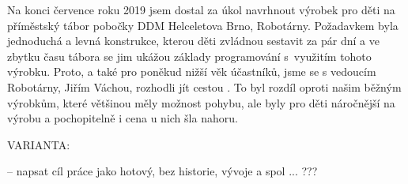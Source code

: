 



Na konci července roku 2019 jsem dostal za úkol navrhnout výrobek pro děti na příměstský tábor
pobočky DDM Helceletova Brno, Robotárny. 
Poža\-dav\-kem byla jednoduchá a levná konstrukce,
kterou děti zvládnou sestavit za pár dní a ve zbytku času tábora se jim ukážou základy programování
s~využitím tohoto výrobku. Proto, a také pro poněkud nižší věk účastníků, jsme se s vedoucím 
Robotárny, Jiřím Váchou, rozhodli jít cestou . To byl rozdíl oproti našim běžným 
výrobkům, které většinou měly možnost pohybu, ale byly pro děti náročnější na výrobu
a pochopitelně i cena u nich šla nahoru.

VARIANTA: 

-- napsat cíl práce jako hotový, bez historie, vývoje a spol ... ???  



\newpage
